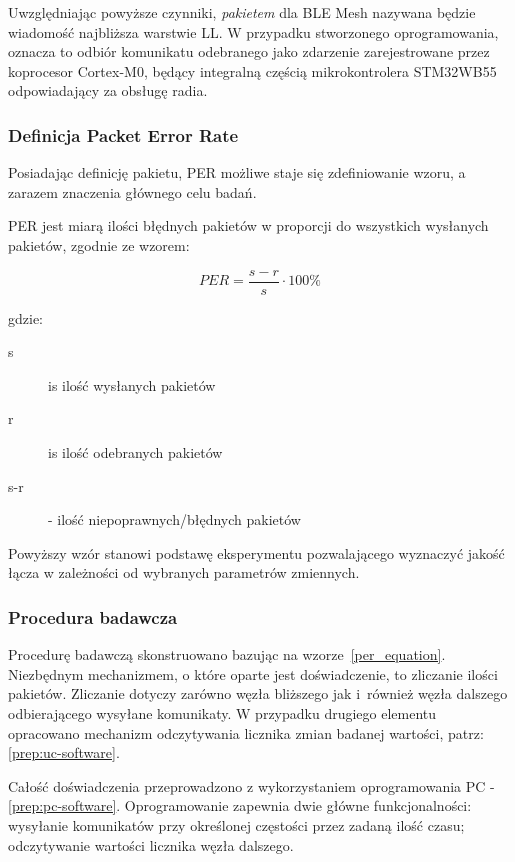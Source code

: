 Uwzględniając powyższe czynniki, \textit{pakietem} dla BLE Mesh nazywana będzie wiadomość najbliższa warstwie \gls{LL}.
W przypadku stworzonego oprogramowania, oznacza to odbiór komunikatu odebranego jako zdarzenie zarejestrowane przez
koprocesor Cortex-M0, będący integralną częścią mikrokontrolera STM32WB55 odpowiadający za obsługę radia.

\subsubsection{Definicja Packet Error Rate}
Posiadając definicję pakietu, \gls{PER} możliwe staje się zdefiniowanie wzoru, a zarazem znaczenia
głównego celu badań.

PER jest miarą ilości błędnych pakietów w proporcji do wszystkich wysłanych pakietów, zgodnie ze wzorem:

\begin{equation}
\label{per_equation}
PER = \frac{s - r}{s} \cdot 100\%
\end{equation}

gdzie:

\begin{description}
\item[s] is ilość wysłanych pakietów
\item[r] is ilość odebranych pakietów
\item[s-r] - ilość niepoprawnych/błędnych pakietów
\end{description}

Powyższy wzór stanowi podstawę eksperymentu pozwalającego wyznaczyć jakość łącza w zależności od
wybranych parametrów zmiennych.

\subsubsection{Procedura badawcza}\label{subsubsec:test-procedure}

Procedurę badawczą skonstruowano bazując na wzorze~\ref{per_equation}. Niezbędnym mechanizmem, o które oparte
jest doświadczenie, to zliczanie ilości pakietów. Zliczanie dotyczy zarówno węzła bliższego 
jak i~również węzła dalszego odbierającego wysyłane komunikaty. W przypadku drugiego elementu 
opracowano mechanizm odczytywania licznika zmian badanej wartości, patrz: \ref{prep:uc-software}.

Całość doświadczenia przeprowadzono z wykorzystaniem oprogramowania PC - \ref{prep:pc-software}. Oprogramowanie
zapewnia dwie główne funkcjonalności: wysyłanie komunikatów przy określonej częstości przez zadaną ilość czasu;
odczytywanie wartości licznika węzła dalszego.

